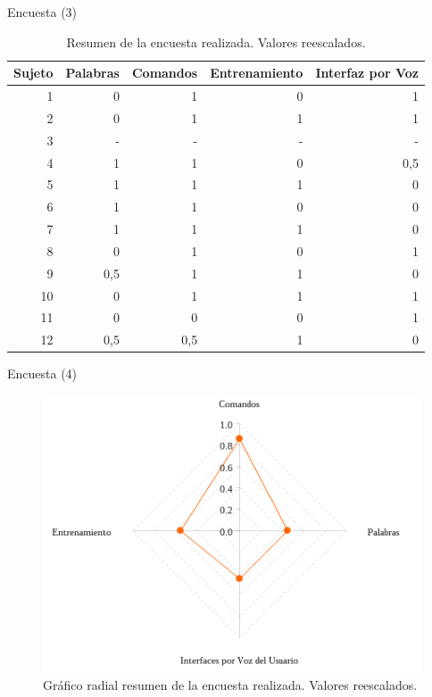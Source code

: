\begin{frame}{Encuesta (3)}

\begin{table}[H] 
\centering
\footnotesize
\begin{tabular}{|r|r|r|r|r|}
\hline
    Sujeto &  Palabras & Comandos & Entrenamiento & Interfaz por Voz \\
    \hline
1 &  0 & 1 & 0 & 1\\
2 &  0 & 1 & 1 & 1\\
3 &  - & - & - & -\\
4 &  1 & 1 & 0 & 0,5\\
5 &  1 & 1 & 1 & 0\\
6 &  1 & 1 & 0 & 0\\
7 &  1 & 1 & 1 & 0\\
8 &  0 & 1 & 0 & 1\\
9 &  0,5 & 1 & 1 & 0\\
10 & 0 & 1 & 1 & 1\\
11 & 0 & 0 & 0 & 1\\
12 & 0,5 & 0,5 & 1 & 0\\
\hline
\end{tabular}
\caption{Resumen de la encuesta realizada. Valores reescalados.}
\label{sec:tabla-encuesta-normalizada}
\end{table}
\end{frame}

\begin{frame}{Encuesta (4)}
\begin{figure}[ht]
\centering
\includegraphics[width=0.6\linewidth]{./graphics/kiviat.png}
\caption{Gr\'afico radial resumen de la encuesta realizada. Valores reescalados.}
\label{figure:kiviat-encuesta2}
\end{figure}

\end{frame}
